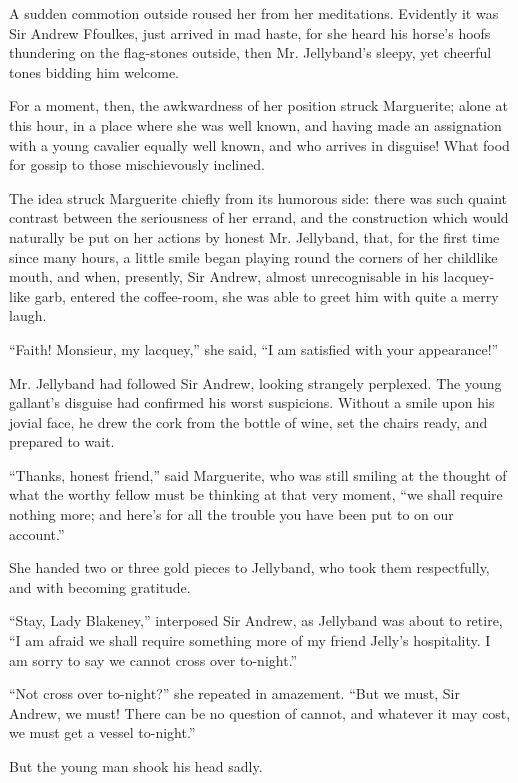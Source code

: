 \documentclass[paper=5.5in:8.5in,BCOR=7mm,twoside,DIV=calc,12pt,usegeometry,chapterprefix,endperiod,headings=big]{scrbook}
\begin{document}
A sudden commotion outside roused her from her meditations. Evidently it was Sir Andrew Ffoulkes, just arrived in mad haste, for she heard his horse's hoofs thundering on the flag-stones outside, then Mr. Jellyband's sleepy, yet cheerful tones bidding him welcome.

For a moment, then, the awkwardness of her position struck Marguerite; alone at this hour, in a place where she was well known, and having made an assignation with a young cavalier equally well known, and who arrives in disguise! What food for gossip to those mischievously inclined.

The idea struck Marguerite chiefly from its humorous side: there was such quaint contrast between the seriousness of her errand, and the construction which would naturally be put on her actions by honest Mr. Jellyband, that, for the first time since many hours, a little smile began playing round the corners of her childlike mouth, and when, presently, Sir Andrew, almost unrecognisable in his lacquey-like garb, entered the coffee-room, she was able to greet him with quite a merry laugh.

\enquote{Faith! Monsieur, my lacquey,} she said, \enquote{I am satisfied with your appearance!}

Mr. Jellyband had followed Sir Andrew, looking strangely perplexed. The young gallant's disguise had confirmed his worst suspicions. Without a smile upon his jovial face, he drew the cork from the bottle of wine, set the chairs ready, and prepared to wait.

\enquote{Thanks, honest friend,} said Marguerite, who was still smiling at the thought of what the worthy fellow must be thinking at that very moment, \enquote{we shall require nothing more; and here's for all the trouble you have been put to on our account.}

She handed two or three gold pieces to Jellyband, who took them respectfully, and with becoming gratitude.

\enquote{Stay, Lady Blakeney,} interposed Sir Andrew, as Jellyband was about to retire, \enquote{I am afraid we shall require something more of my friend Jelly's hospitality. I am sorry to say we cannot cross over to-night.}

\enquote{Not cross over to-night?} she repeated in amazement. \enquote{But we must, Sir Andrew, we must! There can be no question of cannot, and whatever it may cost, we must get a vessel to-night.}

But the young man shook his head sadly.
\end{document}
